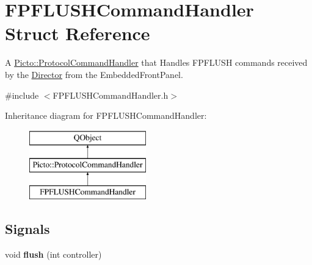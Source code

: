 \hypertarget{struct_f_p_f_l_u_s_h_command_handler}{\section{F\-P\-F\-L\-U\-S\-H\-Command\-Handler Struct Reference}
\label{struct_f_p_f_l_u_s_h_command_handler}
}


A \hyperlink{struct_picto_1_1_protocol_command_handler}{Picto\-::\-Protocol\-Command\-Handler} that Handles F\-P\-F\-L\-U\-S\-H commands received by the \hyperlink{class_director}{Director} from the Embedded\-Front\-Panel.  




{\ttfamily \#include $<$F\-P\-F\-L\-U\-S\-H\-Command\-Handler.\-h$>$}

Inheritance diagram for F\-P\-F\-L\-U\-S\-H\-Command\-Handler\-:\begin{figure}[H]
\begin{center}
\leavevmode
\includegraphics[height=3.000000cm]{struct_f_p_f_l_u_s_h_command_handler}
\end{center}
\end{figure}
\subsection*{Signals}
\begin{DoxyCompactItemize}
\item 
\hypertarget{struct_f_p_f_l_u_s_h_command_handler_a5e588af5a07429d23de76e4b42339928}{void {\bfseries flush} (int controller)}\label{struct_f_p_f_l_u_s_h_command_handler_a5e588af5a07429d23de76e4b42339928}

\end{DoxyCompactItemize}
